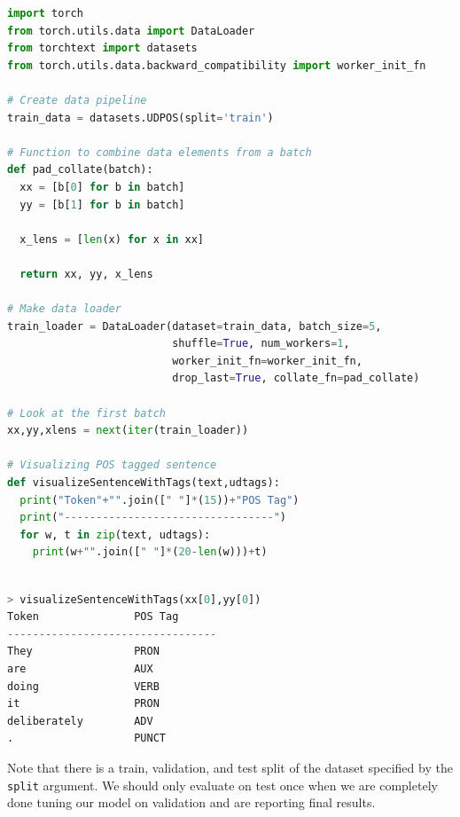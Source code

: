 \documentclass[a4paper,10pt]{article}
\begin{document}
\begin{center}
\begin{minipage}{0.8\textwidth}
\begin{lstlisting}[language=Python, caption=Loading the UD En POS benchmark]
import torch
from torch.utils.data import DataLoader
from torchtext import datasets
from torch.utils.data.backward_compatibility import worker_init_fn

# Create data pipeline
train_data = datasets.UDPOS(split='train')

# Function to combine data elements from a batch
def pad_collate(batch):
  xx = [b[0] for b in batch]
  yy = [b[1] for b in batch]
  
  x_lens = [len(x) for x in xx]
  
  return xx, yy, x_lens

# Make data loader
train_loader = DataLoader(dataset=train_data, batch_size=5, 
                          shuffle=True, num_workers=1,
                          worker_init_fn=worker_init_fn,
                          drop_last=True, collate_fn=pad_collate)

# Look at the first batch
xx,yy,xlens = next(iter(train_loader))

# Visualizing POS tagged sentence
def visualizeSentenceWithTags(text,udtags):
  print("Token"+"".join([" "]*(15))+"POS Tag")
  print("---------------------------------")
  for w, t in zip(text, udtags):
    print(w+"".join([" "]*(20-len(w)))+t)
\end{lstlisting}
\end{minipage}
\end{center}


\begin{center}
\begin{minipage}{0.8\textwidth}
\begin{lstlisting}[language=Python, caption=Visualizing a sentence and its associated list of tags.]

> visualizeSentenceWithTags(xx[0],yy[0])
Token               POS Tag
---------------------------------
They                PRON
are                 AUX
doing               VERB
it                  PRON
deliberately        ADV
.                   PUNCT
\end{lstlisting}
\end{minipage}
\end{center}

\noindent Note that there is a train, validation, and test split of the dataset specified by the \texttt{split} argument. We should only evaluate on test once when we are completely done tuning our model on validation and are reporting final results. 
\end{document}
